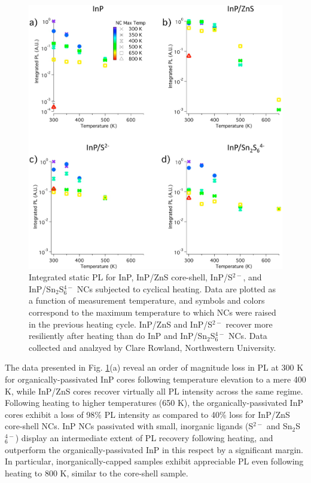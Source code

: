 \begin{figure}
\begin{center}
\includegraphics[width=\textwidth]{./Chapter5/inp1.jpeg}
\caption[Integrated PL intensity from InP NCs with four different surface terminations at a variety of temperatures.]{Integrated static PL for InP, InP/ZnS core-shell, InP/S$^{2-}$, and InP/Sn$_2$S$_6^{4-}$ NCs subjected to cyclical heating. Data are plotted as a function of measurement temperature, and symbols and colors correspond to the maximum temperature to which NCs were raised in the previous heating cycle. InP/ZnS and InP/S$^{2-}$ recover more resiliently after heating than do InP and InP/Sn$_2$S$_6^{4-}$ NCs. Data collected and analzyed by Clare Rowland, Northwestern University.}
\label{f:inp1}
\end{center}
\end{figure}

The data presented in Fig. \ref{f:inp1}(a) reveal an order of magnitude loss in PL at 300 K for organically-passivated InP cores following temperature elevation to a mere 400 K, while InP/ZnS cores recover virtually all PL intensity across the same regime. Following heating to higher temperatures (650 K), the organically-passivated InP cores exhibit a loss of 98\% PL intensity as compared to 40\% loss for InP/ZnS core-shell NCs. InP NCs passivated with small, inorganic ligands (S$^{2-}$ and Sn$_2$S$_6^{4-}$) display an intermediate extent of PL recovery following heating, and outperform the organically-passivated InP in this respect by a significant margin. In particular, inorganically-capped samples exhibit appreciable PL even following heating to 800 K, similar to the core-shell sample. \par

